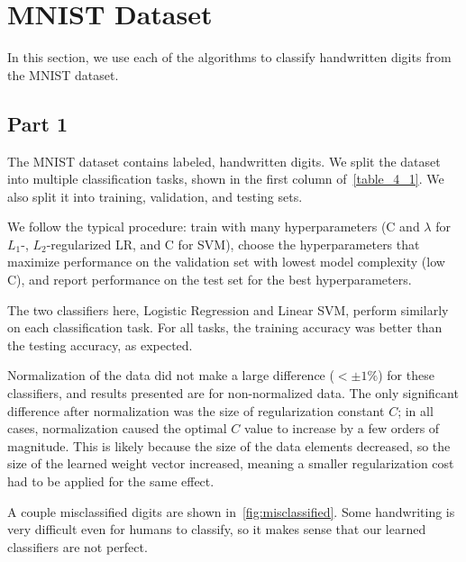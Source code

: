 \section{MNIST Dataset} \label{sec:prob4}
In this section, we use each of the algorithms to classify handwritten digits from the MNIST dataset.

\subsection{Part 1}
The MNIST dataset contains labeled, handwritten digits.
We split the dataset into multiple classification tasks, shown in the first column of~\cref{table_4_1}.
We also split it into training, validation, and testing sets.

We follow the typical procedure: train with many hyperparameters (C and $\lambda$ for $L_1$-, $L_2$-regularized LR, and C for SVM), choose the hyperparameters that maximize performance on the validation set with lowest model complexity (low C), and report performance on the test set for the best hyperparameters.

The two classifiers here, Logistic Regression and Linear SVM, perform similarly on each classification task.
For all tasks, the training accuracy was better than the testing accuracy, as expected.

Normalization of the data did not make a large difference ($<\pm 1\%$) for these classifiers, and results presented are for non-normalized data.
The only significant difference after normalization was the size of regularization constant $C$; in all cases, normalization caused the optimal $C$ value to increase by a few orders of magnitude.
This is likely because the size of the data elements decreased, so the size of the learned weight vector increased, meaning a smaller regularization cost had to be applied for the same effect.

A couple misclassified digits are shown in~\cref{fig:misclassified}.
Some handwriting is very difficult even for humans to classify, so it makes sense that our learned classifiers are not perfect.

